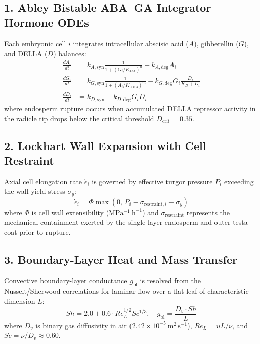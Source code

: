 \documentclass[10pt,a4paper]{article}
\begin{document}
\subsection*{1. Abley Bistable ABA--GA Integrator Hormone ODEs}
Each embryonic cell $i$ integrates intracellular abscisic acid ($A$), gibberellin ($G$), and DELLA ($D$) balances:
\begin{align}
\frac{dA_i}{dt} &= k_{A,\mathrm{syn}} \frac{1}{1 + (G_i / K_{GA})^n} - k_{A,\mathrm{deg}} A_i\\
\frac{dG_i}{dt} &= k_{G,\mathrm{syn}} \frac{1}{1 + (A_i / K_{ABA})^m} - k_{G,\mathrm{deg}} G_i \frac{D_i}{K_D + D_i}\\
\frac{dD_i}{dt} &= k_{D,\mathrm{syn}} - k_{D,\mathrm{deg}} G_i D_i
\end{align}
where endosperm rupture occurs when accumulated DELLA repressor activity in the radicle tip drops below the critical threshold $D_{\mathrm{crit}} = 0.35$.

\subsection*{2. Lockhart Wall Expansion with Cell Restraint}
Axial cell elongation rate $\dot{\epsilon}_i$ is governed by effective turgor pressure $P_i$ exceeding the wall yield stress $\sigma_y$:
\begin{equation}
\dot{\epsilon}_i = \Phi \max\left(0,\, P_i - \sigma_{\mathrm{restraint},i} - \sigma_y\right)
\end{equation}
where $\Phi$ is cell wall extensibility ($\mathrm{MPa^{-1}\,h^{-1}}$) and $\sigma_{\mathrm{restraint}}$ represents the mechanical containment exerted by the single-layer endosperm and outer testa coat prior to rupture.

\subsection*{3. Boundary-Layer Heat and Mass Transfer}
Convective boundary-layer conductance $g_{\mathrm{bl}}$ is resolved from the Nusselt/Sherwood correlations for laminar flow over a flat leaf of characteristic dimension $L$:
\begin{equation}
Sh = 2.0 + 0.6 \cdot Re_L^{1/2} Sc^{1/3},\quad g_{\mathrm{bl}} = \frac{D_v \cdot Sh}{L}
\end{equation}
where $D_v$ is binary gas diffusivity in air ($2.42 \times 10^{-5}\ \mathrm{m^2\,s^{-1}}$), $Re_L = u L / \nu$, and $Sc = \nu / D_v \approx 0.60$.
\end{document}
